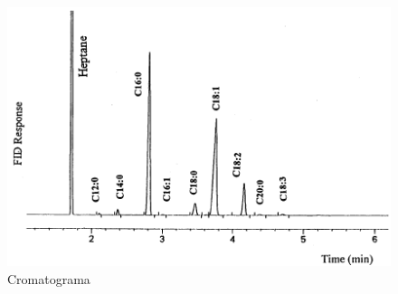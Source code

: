 \documentclass[a4paper,12pt]{article}
\begin{document}
\begin{figure}[H]
\centering
\includegraphics[scale=0.9]{cromatograma}
\caption{Cromatograma}
\label{fig: Figura 2}
\end{figure}

\vspace{3mm}
\end{document}
